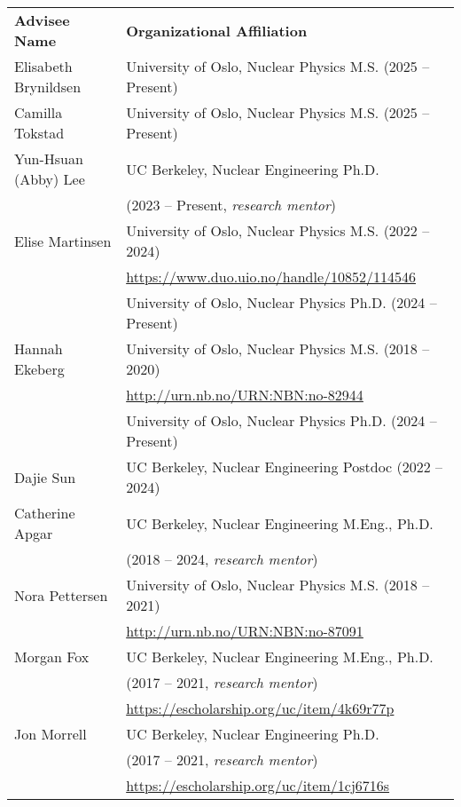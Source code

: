 \begin{longtable}{ @{} l @{\hspace{5ex}} l }
\bf{Advisee Name}   &  \bf{Organizational Affiliation}\\

Elisabeth Brynildsen & University of Oslo, Nuclear Physics M.S. (2025 -- Present)\\
Camilla Tokstad & University of Oslo, Nuclear Physics M.S. (2025 -- Present)\\
Yun-Hsuan (Abby) Lee & UC Berkeley, Nuclear Engineering Ph.D. \\ & (2023 -- Present, \textit{research mentor})\\
Elise Martinsen & University of Oslo, Nuclear Physics M.S. (2022 -- 2024)\\
& \url{https://www.duo.uio.no/handle/10852/114546}\vspace{0.5mm}\\
& University of Oslo, Nuclear Physics Ph.D. (2024 -- Present)\\
Hannah Ekeberg & University of Oslo, Nuclear Physics M.S. (2018 -- 2020)\\
& \url{http://urn.nb.no/URN:NBN:no-82944}\vspace{0.5mm}\\
& University of Oslo, Nuclear Physics Ph.D. (2024 -- Present)\\
Dajie Sun & UC Berkeley, Nuclear Engineering Postdoc  (2022 -- 2024)\\
Catherine  Apgar & UC Berkeley, Nuclear Engineering M.Eng., Ph.D. \\ & (2018 -- 2024, \textit{research mentor})\\
Nora Pettersen & University of Oslo, Nuclear Physics M.S. (2018 -- 2021)\\
               & \url{http://urn.nb.no/URN:NBN:no-87091}\vspace{0.5mm}\\
Morgan  Fox & UC Berkeley, Nuclear Engineering M.Eng., Ph.D. \\ & (2017 -- 2021, \textit{research mentor})\\
                & \url{https://escholarship.org/uc/item/4k69r77p}\vspace{0.5mm}\\               
Jon  Morrell & UC Berkeley, Nuclear Engineering Ph.D. \\ & (2017 -- 2021, \textit{research mentor})\\
                & \url{https://escholarship.org/uc/item/1cj6716s}\vspace{0.5mm}\\


\end{longtable}

